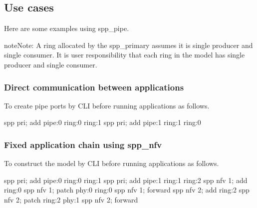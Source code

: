 \documentclass[a4paper,11pt,openany,oneside,english]{sphinxmanual}
\begin{document}
\subsection{Use cases}
\label{\detokenize{usecases/pipe_pmd:use-cases}}
Here are some examples using spp\_pipe.

\begin{sphinxadmonition}{note}{Note:}
A ring allocated by the spp\_primary assumes it is single
producer and single consumer. It is user responsibility
that each ring in the model has single producer and single
consumer.
\end{sphinxadmonition}


\subsubsection{Direct communication between applications}
\label{\detokenize{usecases/pipe_pmd:direct-communication-between-applications}}
\begin{figure}[htbp]
\centering

\noindent{}
\end{figure}

To create pipe ports by CLI before running applications as follows.

\begin{sphinxVerbatim}[commandchars=\\\{\},formatcom=\footnotesize]
spp \PYGZgt{} pri; add pipe:0 ring:0 ring:1
spp \PYGZgt{} pri; add pipe:1 ring:1 ring:0
\end{sphinxVerbatim}


\subsubsection{Fixed application chain using spp\_nfv}
\label{\detokenize{usecases/pipe_pmd:fixed-application-chain-using-spp-nfv}}
\begin{figure}[htbp]
\centering

\noindent{}
\end{figure}

To construct the model by CLI before running applications as follows.

\begin{sphinxVerbatim}[commandchars=\\\{\},formatcom=\footnotesize]
spp \PYGZgt{} pri; add pipe:0 ring:0 ring:1
spp \PYGZgt{} pri; add pipe:1 ring:1 ring:2
spp \PYGZgt{} nfv 1; add ring:0
spp \PYGZgt{} nfv 1; patch phy:0 ring:0
spp \PYGZgt{} nfv 1; forward
spp \PYGZgt{} nfv 2; add ring:2
spp \PYGZgt{} nfv 2; patch ring:2 phy:1
spp \PYGZgt{} nfv 2; forward
\end{sphinxVerbatim}
\end{document}
